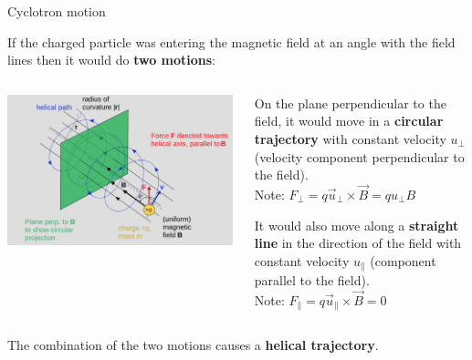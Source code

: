\begin{frame}{Cyclotron motion}

If the charged particle was entering the magnetic field at an angle with the field lines then it would do {\bf two motions}:\\
\vspace{0.2cm}

\begin{columns}
  \begin{column}{0.50\textwidth}
    \begin{center}
      \includegraphics[width=0.99\textwidth]{./images/schematics/cyclotron_motion_02.png}\\
    \end{center}
  \end{column}
  \begin{column}{0.50\textwidth}
      \begin{itemize}
      {\small
         \item On the plane perpendicular to the field, it would move in a {\bf circular trajectory}
                   with constant velocity $u_{\perp}$ (velocity component perpendicular to the field).\\
                   Note: $F_{\perp} = q \vec{u}_{\perp} \times \vec{B} = q {u}_{\perp} B$
         \item It would also move along a {\bf straight line} in the direction of the field with constant
                   velocity $u_{\parallel}$  (component parallel to the field).\\
                   Note: $F_{\parallel} = q \vec{u}_{\parallel} \times \vec{B} = 0$
      }
      \end{itemize}
  \end{column}
\end{columns}

\vspace{0.2cm}
The combination of the two motions causes a {\bf helical trajectory}.\\

\end{frame}


